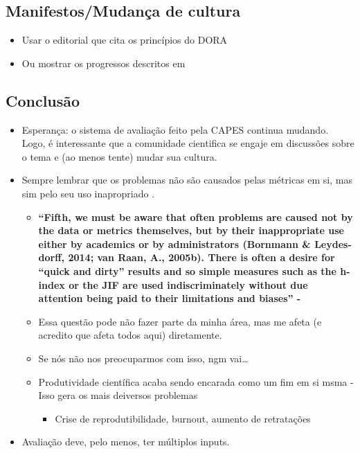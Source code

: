 \documentclass[11pt]{article}
\begin{document}
\subsection{Manifestos/Mudança de cultura}
\label{sec:orgf1a28a6}
\begin{itemize}
\item Usar o editorial que cita os princípios do DORA \cite{cagan2013}
\item Ou mostrar os progressos descritos em \cite{hatch2020}
\end{itemize}

\subsection{Conclusão}
\label{sec:orge0e0cec}
\begin{itemize}
\item Esperança: o sistema de avaliação feito pela CAPES continua mudando. Logo, é interessante que a comunidade cientifica se engaje em discussões sobre o tema e (ao menos tente) mudar sua cultura.
\item Sempre lembrar que os problemas não são causados pelas métricas em si, mas sim pelo seu uso inapropriado .
\begin{itemize}
\item \textbf{“Fifth, we must be aware that often problems are caused not by the data or metrics themselves, but by their inappropriate use either by academics or by administrators (Bornmann \& Leydes- dorff, 2014; van Raan, A., 2005b). There is often a desire for  “quick and dirty” results and so simple measures such as the h- index or the JIF are used indiscriminately without due attention being paid to their limitations and biases” - \cite{mingers2015}}
\item Essa questão pode não fazer parte da minha área, mas me afeta (e acredito que afeta todos aqui) diretamente.
\item Se nós não nos preocuparmos com isso, ngm vai\ldots{}
\item Produtividade científica acaba sendo encarada como um fim em si msma - Isso gera os mais deiversos problemas
\begin{itemize}
\item Crise de reprodutibilidade, burnout, aumento de retratações
\end{itemize}
\end{itemize}
\item Avaliação deve, pelo menos, ter múltiplos inputs.
\begin{itemize}

\end{itemize}
\end{itemize}
\end{document}
